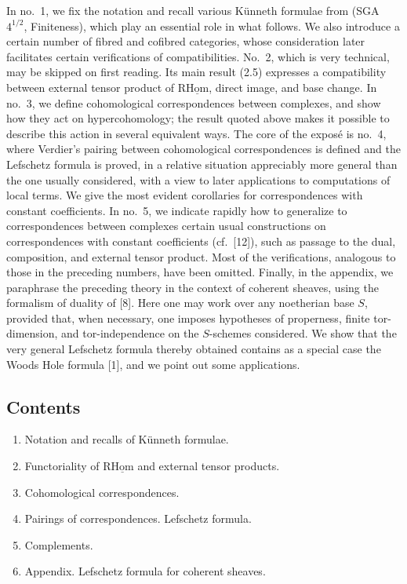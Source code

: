 \documentclass[11pt]{article}
\begin{document}
In no.~1, we fix the notation and recall various Künneth formulae from (SGA~$4^{1/2}$, Finiteness), which play an essential role in what follows. We also introduce a certain number of fibred and cofibred categories, whose consideration later facilitates certain verifications of compatibilities. No.~2, which is very technical, may be skipped on first reading. Its main result (2.5) expresses a compatibility between external tensor product of $\mathrm{R}\underline{\mathrm{Hom}}$, direct image, and base change. In no.~3, we define cohomological correspondences between complexes, and show how they act on hypercohomology; the result quoted above makes it possible to describe this action in several equivalent ways. The core of the exposé is no.~4, where Verdier's pairing between cohomological correspondences is defined and the Lefschetz formula is proved, in a relative situation appreciably more general than the one usually considered, with a view to later applications to computations of local terms. We give the most evident corollaries for correspondences with constant coefficients. In no.~5, we indicate rapidly how to generalize to correspondences between complexes certain usual constructions on correspondences with constant coefficients (cf.~[12]), such as passage to the dual, composition, and external tensor product. Most of the verifications, analogous to those in the preceding numbers, have been omitted. Finally, in the appendix, we paraphrase the preceding theory in the context of coherent sheaves, using the formalism of duality of [8]. Here one may work over any noetherian base $S$, provided that, when necessary, one imposes hypotheses of properness, finite tor-dimension, and tor-independence on the $S$-schemes considered. We show that the very general Lefschetz formula thereby obtained contains as a special case the Woods Hole formula [1], and we point out some applications.

\subsection*{Contents}
\begin{enumerate}[label=\arabic*.]
\item Notation and recalls of Künneth formulae.
\item Functoriality of $\mathrm{R}\underline{\mathrm{Hom}}$ and external tensor products.
\item Cohomological correspondences.
\item Pairings of correspondences. Lefschetz formula.
\item Complements.
\item Appendix. Lefschetz formula for coherent sheaves.
\end{enumerate}
\end{document}
